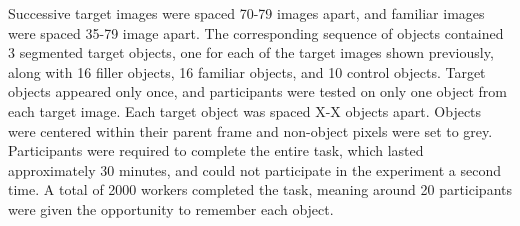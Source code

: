 Successive target images were spaced 70-79 images apart, and familiar images were spaced 35-79 image apart. The corresponding sequence of objects contained 3 segmented target objects, one for each of the target images shown previously, along with 16 filler objects, 16 familiar objects, and 10 control objects. Target objects appeared only once, and participants were tested on only one object from each target image. Each target object was spaced X-X objects apart. Objects were centered within their parent frame and non-object pixels were set to grey. Participants were required to complete the entire task, which lasted approximately 30 minutes, and could not participate in the experiment a second time. A total of 2000 workers completed the task, meaning around 20 participants were given the opportunity to remember each object.


